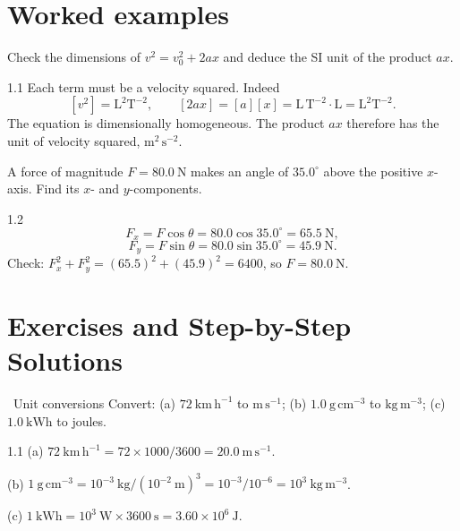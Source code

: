 \section{Worked examples}

\begin{worked}
Check the dimensions of $v^2=v_0^2+2ax$ and deduce the SI unit of the product
$ax$.
\end{worked}

\begin{solution}{1.1}
Each term must be a velocity squared. Indeed
\[
[v^2]=\mathrm{L^2T^{-2}},\qquad
[2ax]=[a][x]=\mathrm{L\,T^{-2}}\cdot\mathrm{L}=\mathrm{L^2T^{-2}}.
\]
The equation is dimensionally homogeneous. The product $ax$ therefore has the
unit of velocity squared, $\mathrm{m^2\,s^{-2}}$.
\end{solution}

\begin{worked}
A force of magnitude $F=80.0\ \mathrm{N}$ makes an angle of $35.0^\circ$ above the
positive $x$-axis. Find its $x$- and $y$-components.
\end{worked}

\begin{solution}{1.2}
\[
F_x=F\cos\theta=80.0\cos35.0^\circ=65.5\ \mathrm{N},
\]
\[
F_y=F\sin\theta=80.0\sin35.0^\circ=45.9\ \mathrm{N}.
\]
Check: $F_x^2+F_y^2=(65.5)^2+(45.9)^2=6400$, so $F=80.0\ \mathrm{N}$.
\end{solution}

\section{Exercises and Step-by-Step Solutions}

\begin{exercise}{\warm\ Unit conversions}
Convert: (a) $72\ \mathrm{km\,h^{-1}}$ to $\mathrm{m\,s^{-1}}$;
(b) $1.0\ \mathrm{g\,cm^{-3}}$ to $\mathrm{kg\,m^{-3}}$;
(c) $1.0\ \mathrm{kWh}$ to joules.
\end{exercise}

\begin{tabletworkspace}[6cm]
\end{tabletworkspace}

\begin{solution}{1.1}
(a) $72\ \mathrm{km\,h^{-1}}=72\times1000/3600=20.0\ \mathrm{m\,s^{-1}}$.

(b) $1\ \mathrm{g\,cm^{-3}}=10^{-3}\ \mathrm{kg}/(10^{-2}\ \mathrm{m})^3
=10^{-3}/10^{-6}=10^{3}\ \mathrm{kg\,m^{-3}}$.

(c) $1\ \mathrm{kWh}=10^{3}\ \mathrm{W}\times3600\ \mathrm{s}
=3.60\times10^{6}\ \mathrm{J}$.
\end{solution}

